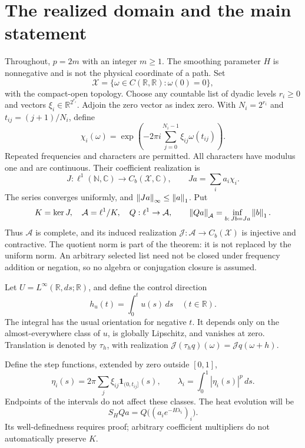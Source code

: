 \documentclass[11pt]{article}
\theoremstyle{remark}\newtheorem{remark}[theorem]{Remark}
\newcommand{\R}{\mathbb R}\newcommand{\C}{\mathbb C}
\newcommand{\A}{\mathcal A}\newcommand{\X}{\mathcal X}
\begin{document}
\section{The realized domain and the main statement}
Throughout, $p=2m$ with an integer $m\ge1$. The smoothing parameter $H$ is nonnegative and is not the physical coordinate of a path. Set
\[
 \X=\{\omega\in C(\R,\R):\omega(0)=0\},
\]
with the compact-open topology. Choose any countable list of dyadic levels $r_i\ge0$ and vectors $\xi_i\in\R^{2^{r_i}}$. Adjoin the zero vector as index zero. With $N_i=2^{r_i}$ and $t_{ij}=(j+1)/N_i$, define
\begin{equation}\label{eq:char}
 \chi_i(\omega)=\exp\left(-2\pi i\sum_{j=0}^{N_i-1}\xi_{ij}\omega(t_{ij})\right).
\end{equation}
Repeated frequencies and characters are permitted. All characters have modulus one and are continuous. Their coefficient realization is
\[
 J:\ell^1(\mathbb N,\C)\longrightarrow C_b(\X,\C),\qquad
 Ja=\sum_i a_i\chi_i.
\]
The series converges uniformly, and $\left\lVert Ja\right\rVert_\infty\le\left\lVert a\right\rVert_1$. Put
\begin{equation}\label{eq:quotient}
 K=\ker J,\quad \A=\ell^1/K,\quad Q:\ell^1\to\A,\qquad
 \norm{Qa}_{\A}=\inf_{b:\,Jb=Ja}\norm b_1.
\end{equation}
Thus $\A$ is complete, and its induced realization $\mathcal J:\A\to C_b(\X)$ is injective and contractive. The quotient norm is part of the theorem: it is not replaced by the uniform norm. An arbitrary selected list need not be closed under frequency addition or negation, so no algebra or conjugation closure is assumed.

Let $U=L^\infty(\R,ds;\R)$, and define the control direction
\[
 h_u(t)=\int_0^t u(s)\,ds\quad(t\in\R).
\]
The integral has the usual orientation for negative $t$. It depends only on the almost-everywhere class of $u$, is globally Lipschitz, and vanishes at zero. Translation is denoted by $\tau_h$, with realization $\mathcal J(\tau_h q)(\omega)=\mathcal Jq(\omega+h)$.

Define the step functions, extended by zero outside $[0,1]$,
\begin{equation}\label{eq:eta}
 \eta_i(s)=2\pi\sum_j\xi_{ij}\mathbf1_{(0,t_{ij}]}(s),
 \qquad \lambda_i=\int_0^1|\eta_i(s)|^p\,ds.
\end{equation}
Endpoints of the intervals do not affect these classes. The heat evolution will be
\begin{equation}\label{eq:heat}
 S_H Qa=Q\big((a_i e^{-H\lambda_i})_i\big).
\end{equation}
Its well-definedness requires proof; arbitrary coefficient multipliers do not automatically preserve $K$.
\end{document}
